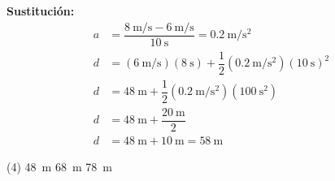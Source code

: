 \documentclass[12pt, letter]{exam}
\begin{document}
\begin{questions}
    \vspace*{0.3cm}
    \textbf{Sustitución:}
    \begin{align*}
    a &= \dfrac{\displaystyle \SI[per-mode=fraction]{8}{\meter\per\second} - \SI[per-mode=fraction]{6}{\meter\per\second}}{\SI{10}{\second}} = \SI[per-mode=fraction]{0.2}{\meter\per\square\second} \\[0.5em]
    d &= \left( \SI[per-mode=fraction]{6}{\meter\per\second} \right)\left( \SI{8}{\second} \right) + \dfrac{1}{2} \left( \SI[per-mode=fraction]{0.2}{\meter\per\square\second} \right) \left( \SI{10}{\second} \right)^{2} \\[0.5em]
    d &= \SI{48}{\meter} + \dfrac{1}{2} \left( \SI[per-mode=fraction]{0.2}{\meter\per\square\second} \right) \left( \SI{100}{\square\second} \right) \\
    d &= \SI{48}{\meter} + \dfrac{\SI{20}{\meter}}{2} \\
    d &= \SI{48}{\meter} + \SI{10}{\meter} = \SI{58}{\meter}
    \end{align*}
     \begin{tasks}(4)
        \task \SI{48}{\meter}
        \task {}
        \task \SI{68}{\meter}
        \task \SI{78}{\meter}
    \end{tasks}
    


\end{questions}
\end{document}
